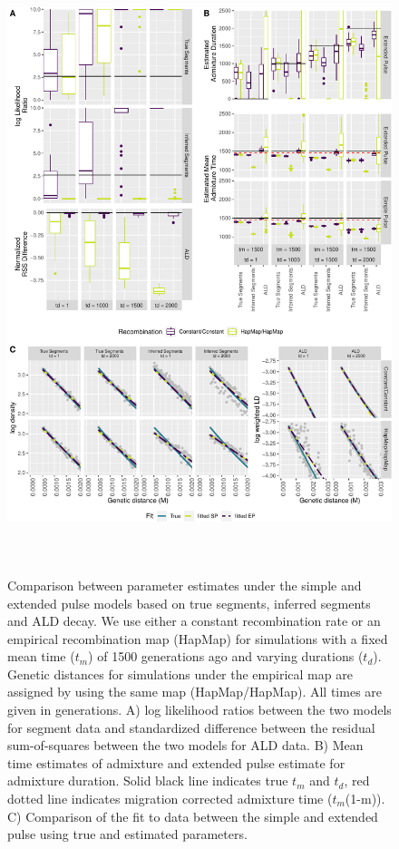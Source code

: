 \documentclass[11pt]{article}
\begin{document}
\begin{figure}
\centering
\includegraphics[width=16cm,height=18cm,keepaspectratio]{ATE_Revisions_files/figure-latex/figResult2_all_together-1.pdf}
\caption{\label{fig:figResult2} Comparison between parameter estimates under the simple and extended pulse models based on true segments, inferred segments and ALD decay. We use either a constant recombination rate or an empirical recombination map (HapMap) for simulations with a fixed mean time ($t_m$) of 1500 generations ago and varying durations ($t_d$). Genetic distances for simulations under the empirical map are assigned by using the same map (HapMap/HapMap). All times are given in generations. A) log likelihood ratios between the two models for segment data and standardized difference between the residual sum-of-squares between the two models for ALD data. B) Mean time estimates of admixture and extended pulse estimate for admixture duration. Solid black line indicates true $t_m$ and $t_d$, red dotted line indicates migration corrected admixture time ($t_m$(1-m)). C) Comparison of the fit to data between the simple and extended pulse using true and estimated parameters. }
\end{figure}
\end{document}
